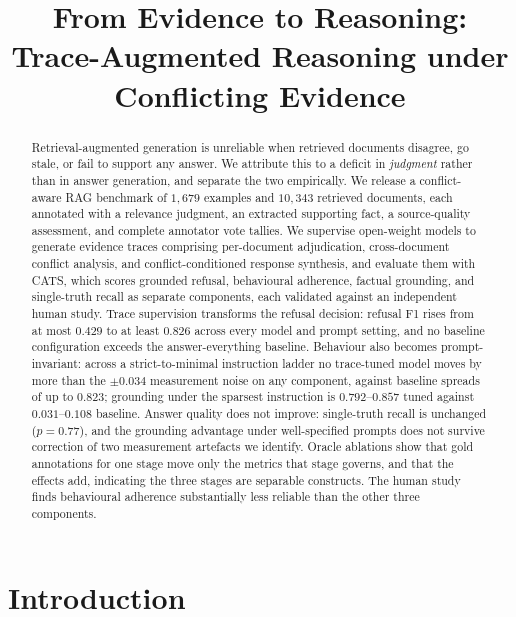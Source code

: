 \documentclass[11pt]{article}
\title{From Evidence to Reasoning: Trace-Augmented Reasoning under Conflicting Evidence}
\author{}
\begin{document}
\maketitle

\begin{abstract}
\vspace{-6pt}
Retrieval-augmented generation is unreliable when retrieved documents disagree,
go stale, or fail to support any answer. We attribute this to a deficit in
\emph{judgment} rather than in answer generation, and separate the two
empirically. We release a conflict-aware RAG benchmark of $1{,}679$ examples and
$10{,}343$ retrieved documents, each annotated with a relevance judgment, an
extracted supporting fact, a source-quality assessment, and complete annotator
vote tallies. We supervise open-weight models to generate evidence traces
comprising per-document adjudication, cross-document conflict analysis, and
conflict-conditioned response synthesis, and evaluate them with CATS, which
scores grounded refusal, behavioural adherence, factual grounding, and
single-truth recall as separate components, each validated against an
independent human study. Trace supervision transforms the refusal decision:
refusal F1 rises from at most $0.429$ to at least $0.826$ across every model and
prompt setting, and no baseline configuration exceeds the answer-everything
baseline. Behaviour also becomes prompt-invariant: across a strict-to-minimal
instruction ladder no trace-tuned model moves by more than the $\pm0.034$
measurement noise on any component, against baseline spreads of up to $0.823$;
grounding under the sparsest instruction is $0.792$--$0.857$ tuned against
$0.031$--$0.108$ baseline. Answer
quality does not improve: single-truth recall is unchanged ($p=0.77$), and the
grounding advantage under well-specified prompts does not survive correction of
two measurement artefacts we identify. Oracle ablations show that gold
annotations for one stage move only the metrics that stage governs, and that the
effects add, indicating the three stages are separable constructs. The human
study finds behavioural adherence substantially less reliable than the other
three components.
\end{abstract}

\section{Introduction}
\label{sec:intro}
\end{document}
